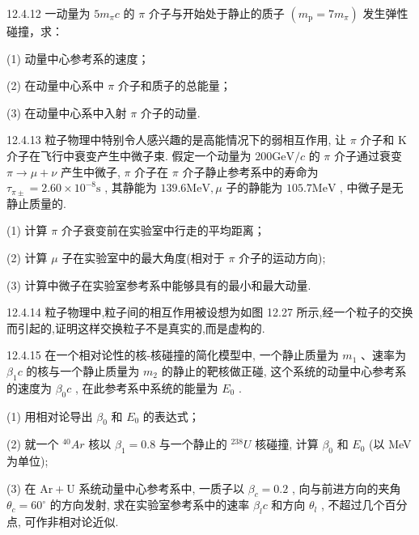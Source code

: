 \begin{problem}{12.4.12}
一动量为 $5m_{\pi}c$ 的 $\pi$ 介子与开始处于静止的质子 $(m_{\mathrm{p}} = 7m_{\pi})$ 发生弹性碰撞，求：

(1) 动量中心参考系的速度；

(2) 在动量中心系中 $\pi$ 介子和质子的总能量；

(3) 在动量中心系中入射 $\pi$ 介子的动量.
\end{problem}
\clearpage


\begin{problem}{12.4.13}
粒子物理中特别令人感兴趣的是高能情况下的弱相互作用, 让 $\pi$ 介子和 K 介子在飞行中衰变产生中微子束. 假定一个动量为 $200\mathrm{GeV} / c$ 的 $\pi$ 介子通过衰变 $\pi \rightarrow \mu + \nu$ 产生中微子, $\pi$ 介子在 $\pi$ 介子静止参考系中的寿命为 $\tau_{\pi \pm} = 2.60 \times 10^{-8}\mathrm{s}$ , 其静能为 $139.6\mathrm{MeV}, \mu$ 子的静能为 $105.7\mathrm{MeV}$ , 中微子是无静止质量的.

(1) 计算 $\pi$ 介子衰变前在实验室中行走的平均距离；

(2) 计算 $\mu$ 子在实验室中的最大角度(相对于 $\pi$ 介子的运动方向);

(3) 计算中微子在实验室参考系中能够具有的最小和最大动量.
\end{problem}
\clearpage


\begin{problem}{12.4.14}
粒子物理中,粒子间的相互作用被设想为如图 12.27 所示,经一个粒子的交换而引起的,证明这样交换粒子不是真实的,而是虚构的.
\begin{center}

\end{center}
\begin{center}

\end{center}
\end{problem}
\clearpage


\begin{problem}{12.4.15}
在一个相对论性的核-核碰撞的简化模型中, 一个静止质量为 $m_{1}$ 、速率为 $\beta_{1}c$ 的核与一个静止质量为 $m_{2}$ 的静止的靶核做正碰, 这个系统的动量中心参考系的速度为 $\beta_{0}c$ , 在此参考系中系统的能量为 $E_{0}$ .

(1) 用相对论导出 $\beta_{0}$ 和 $E_{0}$ 的表达式；

(2) 就一个 $^{40}Ar$ 核以 $\beta_{1}=0.8$ 与一个静止的 $^{238}U$ 核碰撞, 计算 $\beta_{0}$ 和 $E_{0}$ (以 MeV 为单位);

(3) 在 $\mathrm{Ar} + \mathrm{U}$ 系统动量中心参考系中, 一质子以 $\beta_{c} = 0.2$ , 向与前进方向的夹角 $\theta_{c} = 60^{\circ}$ 的方向发射, 求在实验室参考系中的速率 $\beta_{l} c$ 和方向 $\theta_{l}$ , 不超过几个百分点, 可作非相对论近似.
\end{problem}
\clearpage


